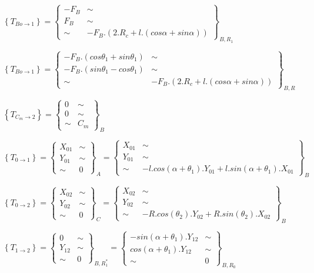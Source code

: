 $\left\{T_{Bo\rightarrow 1}\right\}=
\left\{\begin{array}{cc}
-F_B & \sim \\
F_B & \sim \\
\sim & -F_B.(2.R_c+l.(cos\alpha+sin\alpha))
\end{array}\right\}_{B,R_1}$

$\left\{T_{Bo\rightarrow 1}\right\}=
\left\{\begin{array}{cc}
-F_B.(cos\theta_1+sin\theta_1) & \sim \\
-F_B.(sin\theta_1-cos\theta_1) & \sim \\
\sim & -F_B.(2.R_c+l.(cos\alpha+sin\alpha))
\end{array}\right\}_{B,R}$

$\left\{T_{C_m\rightarrow 2}\right\}=
\left\{\begin{array}{cc}
0 & \sim \\
0 & \sim \\
\sim & C_m
\end{array}\right\}_B$

$\left\{T_{0\rightarrow 1}\right\}=\left\{\begin{array}{cc}
X_{01} & \sim \\
Y_{01} & \sim \\
\sim & 0
\end{array}\right\}_A=
\left\{\begin{array}{cc}
X_{01} & \sim \\
Y_{01} & \sim \\
\sim & -l.cos(\alpha+\theta_1).Y_{01}+l.sin(\alpha+\theta_1).X_{01}
\end{array}\right\}_B$

$\left\{T_{0\rightarrow 2}\right\}=\left\{\begin{array}{cc}
X_{02} & \sim \\
Y_{02} & \sim \\
\sim & 0
\end{array}\right\}_C=
\left\{\begin{array}{cc}
X_{02} & \sim \\
Y_{02} & \sim \\
\sim & -R.cos(\theta_2).Y_{02}+R.sin(\theta_2).X_{02}
\end{array}\right\}_B$

$\left\{T_{1\rightarrow 2}\right\}=\left\{\begin{array}{cc}
0 & \sim \\
Y_{12} & \sim \\
\sim & 0
\end{array}\right\}_{B,R_1^*}=
\left\{\begin{array}{cc}
-sin(\alpha+\theta_1).Y_{12} & \sim \\
cos(\alpha+\theta_1).Y_{12} & \sim \\
\sim & 0
\end{array}\right\}_{B,R_0}$

